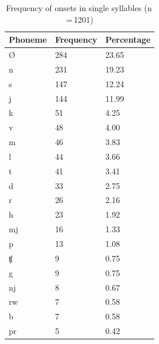 %
\begin{table}\centering
\caption[Frequency of onsets in single syllables]{Frequency of onsets in single
syllables (n\,=\,1201)}
\begin{tabu} to 0.67\linewidth{X X[c] X[c]}
\tableheaderfont\toprule
Phoneme
	& Frequency
	& Percentage
	\\
	
\toprule

Ø
	& 284
	& 23.65\pct
	\\

\midrule

n
	& 231
	& 19.23\pct
	\\

s
	& 147
	& 12.24\pct
	\\

j
	& 144
	& 11.99\pct
	\\

k
	& 51
	& 4.25\pct
	\\

v
	& 48
	& 4.00\pct
	\\

m
	& 46
	& 3.83\pct
	\\

l
	& 44
	& 3.66\pct
	\\

t
	& 41
	& 3.41\pct
	\\

d
	& 33
	& 2.75\pct
	\\

r
	& 26
	& 2.16\pct
	\\

h
	& 23
	& 1.92\pct
	\\

mj
	& 16
	& 1.33\pct
	\\

p
	& 13
	& 1.08\pct
	\\

ʧ
	& 9
	& 0.75\pct
	\\

g
	& 9
	& 0.75\pct
	\\

nj
	& 8
	& 0.67\pct
	\\

rw
	& 7
	& 0.58\pct
	\\

b
	& 7
	& 0.58\pct
	\\

pr
	& 5
	& 0.42\pct
	\\


\end{tabu}
\end{table}
